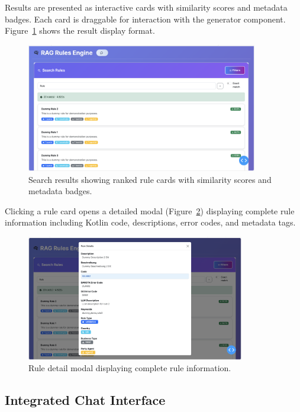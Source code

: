 Results are presented as interactive cards with similarity scores and metadata badges. Each card is draggable for interaction with the generator component. Figure~\ref{fig:search-results} shows the result display format.

\begin{figure}[!htbp]
\centering
\includegraphics[width=0.9\textwidth]{Figures/full_search_results.png}
\caption{Search results showing ranked rule cards with similarity scores and metadata badges.}
\label{fig:search-results}
\end{figure}

Clicking a rule card opens a detailed modal (Figure~\ref{fig:rule-details}) displaying complete rule information including Kotlin code, descriptions, error codes, and metadata tags.

\begin{figure}[!htbp]
\centering
\includegraphics[width=0.85\textwidth]{Figures/rule_details.png}
\caption{Rule detail modal displaying complete rule information.}
\label{fig:rule-details}
\end{figure}

\subsection{Integrated Chat Interface}

